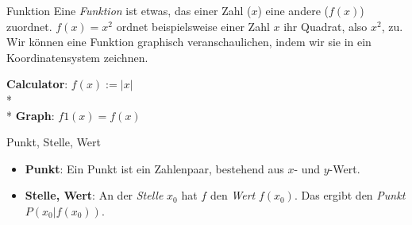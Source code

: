 \begin{bla}{Funktion}
  Eine \emph{Funktion} ist etwas, das einer Zahl ($x$) eine andere ($f(x)$) zuordnet. $f(x)=x^2$ ordnet beispielsweise einer Zahl $x$ ihr Quadrat, also $x^2$, zu. \\
  Wir können eine Funktion graphisch veranschaulichen, indem wir sie in ein Koordinatensystem zeichnen.

  \begin{marginfigure}
    \caption{Graph von $f(x)=x^2$. Für einen $x$-Wert von der $x$-Achse (hier $x_0$) kann sein zugehöriger $f(x)$-Wert (hier $f(x_0)$) abgelesen werden.}
  \end{marginfigure}
  \begin{marginfigure}
    \begin{tcolorbox}[colback=white!95!black,colframe=white!75!black,title=CAS:,arc=0mm]
      \begin{scriptsize}
        \textbf{Calculator}: \hfill \( f(x) := |x| \) \\* \ \\*
        \textbf{Graph}: \hfill \( f1(x) = f(x) \)
      \end{scriptsize}
    \end{tcolorbox}
  \end{marginfigure}
\end{bla}

\begin{bla}{Punkt, Stelle, Wert}
  \begin{itemize}
    \item \textbf{Punkt}: Ein Punkt ist ein Zahlenpaar, bestehend aus $x$- und $y$-Wert.
    \item \textbf{Stelle, Wert}: An der \emph{Stelle} $x_0$ hat $f$ den \emph{Wert} $f(x_0)$. Das ergibt den \emph{Punkt} $P(x_0|f(x_0))$.
  \end{itemize}
\end{bla}

